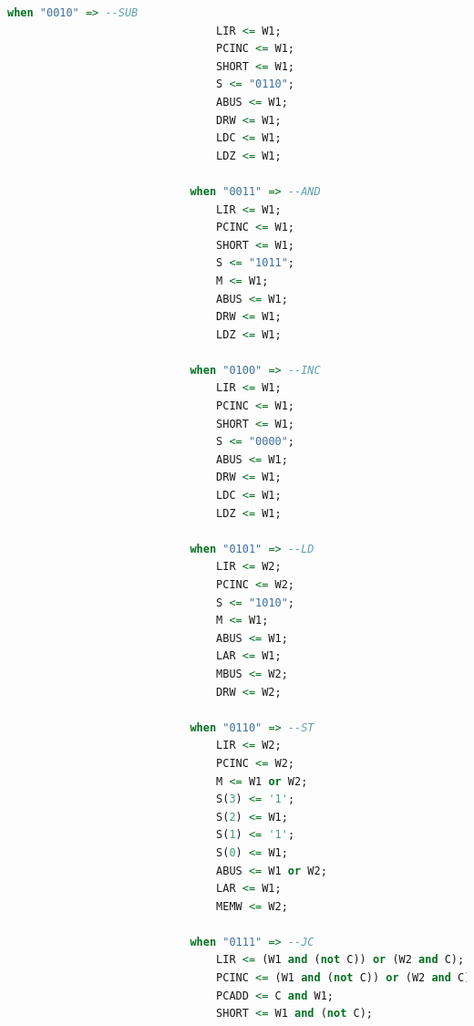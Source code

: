 \documentclass[12pt]{article}
\begin{document}
{\begin{lstlisting}[language=vhdl]
                            when "0010" => --SUB
                                LIR <= W1;
                                PCINC <= W1;
                                SHORT <= W1;
                                S <= "0110";
                                ABUS <= W1;
                                DRW <= W1;
                                LDC <= W1;
                                LDZ <= W1;

                            when "0011" => --AND
                                LIR <= W1;
                                PCINC <= W1;
                                SHORT <= W1;
                                S <= "1011";
                                M <= W1;
                                ABUS <= W1;
                                DRW <= W1;
                                LDZ <= W1;

                            when "0100" => --INC
                                LIR <= W1;
                                PCINC <= W1;
                                SHORT <= W1;
                                S <= "0000";
                                ABUS <= W1;
                                DRW <= W1;
                                LDC <= W1;
                                LDZ <= W1;

                            when "0101" => --LD
                                LIR <= W2;
                                PCINC <= W2;
                                S <= "1010";
                                M <= W1;
                                ABUS <= W1;
                                LAR <= W1;
                                MBUS <= W2;
                                DRW <= W2;

                            when "0110" => --ST
                                LIR <= W2;
                                PCINC <= W2;
                                M <= W1 or W2;
                                S(3) <= '1';
                                S(2) <= W1;
                                S(1) <= '1';
                                S(0) <= W1;
                                ABUS <= W1 or W2;
                                LAR <= W1;
                                MEMW <= W2;

                            when "0111" => --JC
                                LIR <= (W1 and (not C)) or (W2 and C);
                                PCINC <= (W1 and (not C)) or (W2 and C);
                                PCADD <= C and W1;
                                SHORT <= W1 and (not C);


\end{lstlisting}}
\end{document}
